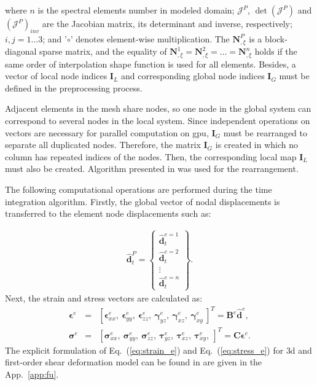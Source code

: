 where $n$ is the spectral elements number in modeled domain; \(\mathcal{J}^P\), \(\det\left(\mathcal{J}^P\right)\) and \(\left(\mathcal{J}^P\right)_{inv}\) are the Jacobian matrix, its determinant and inverse, respectively; $i,j=1\ldots3$; and '$\circ$' denotes element-wise multiplication.
The $\textbf{N}^P_{,\xi}$ is a block-diagonal sparse matrix, and the equality of $\textbf{N}^1_{,\xi}=\textbf{N}^2_{,\xi}=\ldots=\textbf{N}^n_{,\xi}$ holds if the same order of interpolation shape function is used for all elements.
Besides, a vector of local node indices $\textbf{I}_L$ and corresponding global node indices $\textbf{I}_G$ must be defined in the preprocessing process.

Adjacent elements in the mesh share nodes, so one node in the global system can correspond to several nodes in the local system.
Since independent operations on vectors are necessary for parallel computation on \ac{gpu}, $\textbf{I}_G$ must be rearranged to separate all duplicated nodes.
Therefore, the matrix $\textbf{I}_G$ is created in which no column has repeated indices of the nodes.
Then, the corresponding local map $\textbf{I}_L$ must also be created.
Algorithm presented in \cite{kudela2016parallel} was used for the rearrangement.

The following computational operations are performed during the time integration algorithm. Firstly, the global vector of nodal displacements is transferred to the element node displacements such as:

\begin{eqnarray}
	\widehat{\textbf{d}}_t^P = \left\{ \begin{array}{c}
		\widehat{\textbf{d}}_t^{e=1}\\
		\widehat{\textbf{d}}_t^{e=2}\\
		\vdots\\
		\widehat{\textbf{d}}_t^{e=n} \end{array}\right\}.
\end{eqnarray}
Next, the strain and stress vectors are calculated as:
\begin{eqnarray}
	\label{eq:strain_e}
	\boldsymbol{\epsilon}^e & = & \left[\boldsymbol{\epsilon}^e_{xx},\ \boldsymbol{\epsilon}^e_{yy},\ \boldsymbol{\epsilon}^e_{zz},\ \boldsymbol{\gamma}^e_{yz},\ \boldsymbol{\gamma}^e_{xz},\ \boldsymbol{\gamma}^e_{xy}\ \right]^T=\textbf{B}^e\widehat{\textbf{d}}^e,\\
	\label{eq:stress_e}
	\boldsymbol{\sigma}^e & = & \left[\boldsymbol{\sigma}^e_{xx},\ \boldsymbol{\sigma}^e_{yy},\ \boldsymbol{\sigma}^e_{zz},\ \boldsymbol{\tau}^e_{yz},\ \boldsymbol{\tau}^e_{xz},\ \boldsymbol{\tau}^e_{xy},\ \right]^T=\textbf{C}\boldsymbol{\epsilon}^e.
\end{eqnarray}
The explicit formulation of Eq.~(\ref{eq:strain_e}) and Eq.~(\ref{eq:stress_e}) for \ac{3d} and first-order shear deformation model can be found in are given in the App.~\ref{app:fu}.

